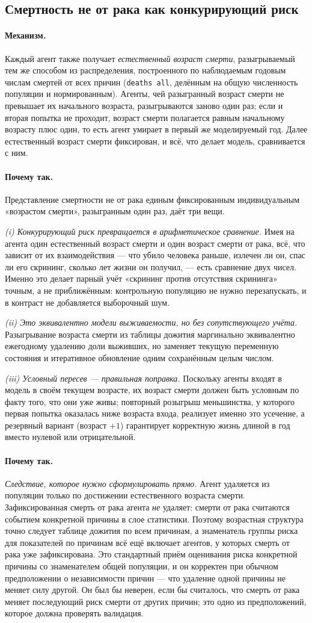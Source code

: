 \documentclass[12pt,a4paper]{article}
\newcommand{\id}[1]{\texttt{#1}}
\newcommand{\mech}[1]{\paragraph{Механизм.} #1}
\newcommand{\why}[1]{\paragraph{Почему так.} #1}
\begin{document}
\subsection{Смертность не от рака как конкурирующий риск}

\mech{Каждый агент также получает \emph{естественный возраст смерти}, разыгрываемый тем же способом из
распределения, построенного по наблюдаемым годовым числам смертей от всех причин (\id{deaths all},
делённым на общую численность популяции и нормированным). Агенты, чей разыгранный возраст смерти не
превышает их начального возраста, разыгрываются заново один раз; если и вторая попытка не проходит, возраст
смерти полагается равным начальному возрасту плюс один, то есть агент умирает в первый же моделируемый год.
Далее естественный возраст смерти фиксирован, и всё, что делает модель, сравнивается с ним.}

\why{Представление смертности не от рака единым фиксированным индивидуальным «возрастом смерти»,
разыгранным один раз, даёт три вещи.

\emph{(i) Конкурирующий риск превращается в арифметическое сравнение.} Имея на агента один естественный
возраст смерти и один возраст смерти от рака, всё, что зависит от их взаимодействия --- что убило человека
раньше, излечен ли он, спас ли его скрининг, сколько лет жизни он получил, --- есть сравнение двух чисел.
Именно это делает парный учёт «скрининг против отсутствия скрининга» точным, а не приближённым: контрольную
популяцию не нужно перезапускать, и в контраст не добавляется выборочный шум.

\emph{(ii) Это эквивалентно модели выживаемости, но без сопутствующего учёта.} Разыгрывание возраста смерти
из таблицы дожития маргинально эквивалентно ежегодному удалению доли выживших, но заменяет текущую
переменную состояния и итеративное обновление одним сохранённым целым числом.

\emph{(iii) Условный пересев --- правильная поправка.} Поскольку агенты входят в модель в своём текущем
возрасте, их возраст смерти должен быть условным по факту того, что они уже живы; повторный розыгрыш
меньшинства, у которого первая попытка оказалась ниже возраста входа, реализует именно это усечение, а
резервный вариант (возраст $+1$) гарантирует корректную жизнь длиной в год вместо нулевой или
отрицательной.}

\why{\emph{Следствие, которое нужно сформулировать прямо.} Агент удаляется из популяции только по
достижении естественного возраста смерти. Зафиксированная смерть от рака агента \emph{не} удаляет: смерти от
рака считаются событием конкретной причины в слое статистики. Поэтому возрастная структура точно следует
таблице дожития по всем причинам, а знаменатель группы риска для показателей по причинам всё ещё включает
агентов, у которых смерть от рака уже зафиксирована. Это стандартный приём оценивания риска конкретной
причины со знаменателем общей популяции, и он корректен при обычном предположении о независимости причин
--- что удаление одной причины не меняет силу другой. Он был бы неверен, если бы считалось, что смерть от
рака меняет последующий риск смерти от других причин; это одно из предположений, которое должна проверять
валидация.}
\end{document}
